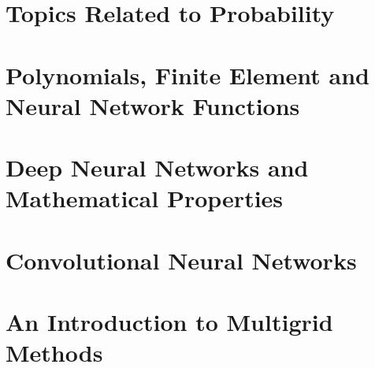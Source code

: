 



%
%


\chapter{Topics Related to Probability}



%



\chapter{ Polynomials, Finite Element and Neural Network Functions}



%
%
%
%

\chapter{Deep Neural Networks and Mathematical Properties}


\chapter{Convolutional Neural Networks}


%



\chapter{An Introduction to Multigrid Methods}


%




